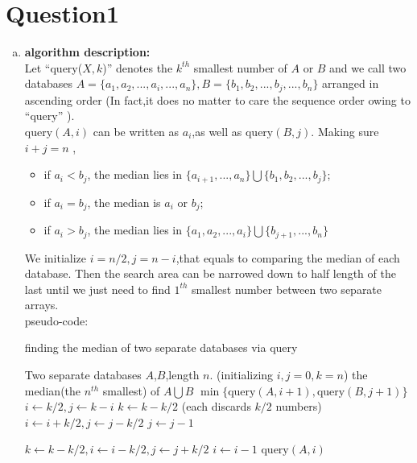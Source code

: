 \section{Question1}
\begin{enumerate}[a).]
\item  \textbf{algorithm description:} \\	
Let ``query($X,k$)'' denotes the $k^{th}$ smallest number of $A$ or $B$ and 
we call two databases $A=\{a_1,a_2,...,a_i,...,a_n\},B=\{b_1,b_2,...,b_j,...,b_n\}$ arranged in
ascending order
(In fact,it does no matter to care the sequence order owing to ``query''  ).\\
$\text{query}(A,i)$ can be written as $a_i$,as well as $\text{query}(B,j)$.
Making sure $i+j=n$ , 
\begin{itemize}
	\item  if $a_i < b_j$, the median lies in $\{a_{i+1},...,a_n\} \bigcup \{b_1,b_2,...,b_j\}$;
	\item  if $a_i = b_j$, the median is $a_i$ or $b_j$;
	\item  if $a_i > b_j$, the median lies in $\{a_1,a_2,...,a_i\} \bigcup \{b_{j+1},...,b_n \}$
\end{itemize}
We initialize $i = n/2, j = n -i$,that equals to comparing the median of each database.
Then the search area can be narrowed down to half length of the last
until we just need to find $1^{th}$ smallest number between two separate arrays. \\
pseudo-code:
\begin{algorithm}[H]
\caption{finding the median of two separate databases via query}
\begin{algorithmic}[1]
\Require Two separate databases $A$,$B$,length $n$. (initializing $i,j=0,k=n$)	
\Ensure  the median(the $n^{th}$ smallest) of $A\bigcup B$
\State \Return $\min \{\text{query}(A,i+1),\text{query}(B,j+1)
		\} $
\EndIf
{}
\State $i \gets k/2, j \gets k - i$
\EndIf
{}
\State $ k \gets k - k/2$ (each discards $k/2$ numbers)
\State $ i \gets i + k/2, j \gets j - k/2$
\State $j \gets j-1$
\EndIf

\State \Return {}
\State $k \gets k-k/2,i \gets i - k/2,j \gets j + k/2$
\State $i \gets i-1$
\EndIf
\State \Return {}
\Else
\State \Return $\text{query}(A,i)$
\EndIf
\EndFunction
\end{algorithmic}	
\end{algorithm}


\end{enumerate}
